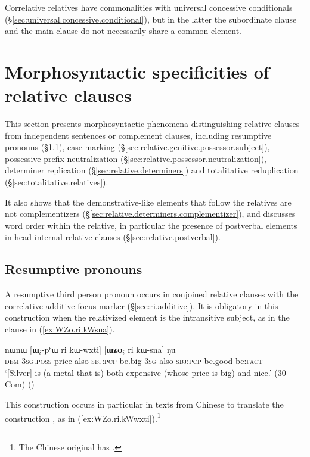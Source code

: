 Correlative relatives have commonalities with universal concessive conditionals (§\ref{sec:universal.concessive.conditional}), but in the latter the subordinate clause and the main clause do not necessarily share a common element.

\section{Morphosyntactic specificities of relative clauses} \label{sec:relative.morphosyntactic.specificities}
This section presents morphosyntactic phenomena distinguishing relative clauses from independent sentences or complement clauses, including resumptive pronouns (§\ref{sec:resumptive}), case marking (§\ref{sec:relative.genitive.possessor.subject}), possessive prefix neutralization (§\ref{sec:relative.possessor.neutralization}), determiner replication (§\ref{sec:relative.determiners}) and totalitative reduplication (§\ref{sec:totalitative.relatives}).

It also shows that the demonstrative-like elements  that follow the relatives 
are not complementizers (§\ref{sec:relative.determiners.complementizer}), and discusses word order within the relative, in particular the presence of postverbal elements in head-internal relative clauses (§\ref{sec:relative.postverbal}).

\subsection{Resumptive pronouns} \label{sec:resumptive}
A resumptive third person pronoun  occurs in conjoined relative clauses with the correlative additive focus marker  (§\ref{sec:ri.additive}). It is obligatory in this construction when the relativized element is the intransitive subject, as in the clause  in (\ref{ex:WZo.ri.kWsna}).

\begin{exe}
\ex \label{ex:WZo.ri.kWsna}
\gll nɯnɯ [\textbf{ɯ}$_i$-pʰɯ ri kɯ-wxti] [\textbf{ɯʑo}$_i$ ri kɯ-sna] ŋu \\
\textsc{dem} \textsc{3sg}.\textsc{poss}-price also \textsc{sbj}:\textsc{pcp}-be.big \textsc{3sg} also \textsc{sbj}:\textsc{pcp}-be.good be:\textsc{fact} \\
\glt `[Silver] is (a metal that is) both expensive (whose price is big) and nice.' (30-Com)
()
\end{exe}

This construction occurs in particular in texts from Chinese to translate the construction , as in (\ref{ex:WZo.ri.kWwxti}).\footnote{The Chinese original has .}

